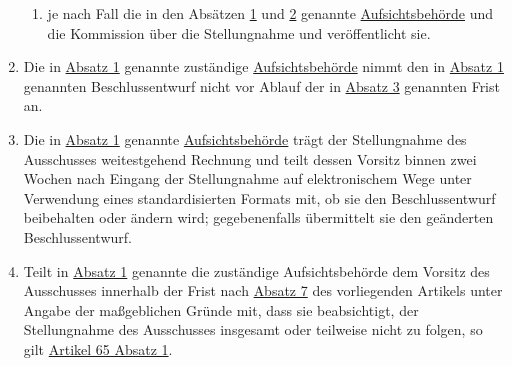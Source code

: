 \begin{enumerate}
\begin{enumerate}
    \item je nach Fall die in den Absätzen \hyperref[itm:64-1]{1} und \hyperref[itm:64-2]{2} genannte \hyperref
     [itm:04-21]{Aufsichtsbehörde} und die Kommission über die Stellungnahme und veröffentlicht sie.%
    \label{itm:64-5b}

  \end{enumerate}

  \item Die in \hyperref[itm:64-1]{Absatz 1} genannte zuständige \hyperref[itm:04-21]{Aufsichtsbehörde} nimmt den in
   \hyperref[itm:64-1]{Absatz 1} genannten Beschlussentwurf nicht vor Ablauf der in \hyperref[itm:64-3]{Absatz 3}
    genannten Frist an.%
  \label{itm:64-6}

  \item Die in \hyperref[itm:64-1]{Absatz 1} genannte \hyperref[itm:04-21]{Aufsichtsbehörde} trägt der Stellungnahme des
   Ausschusses weitestgehend Rechnung und teilt dessen Vorsitz binnen zwei Wochen nach Eingang der Stellungnahme auf
   elektronischem Wege unter Verwendung eines standardisierten Formats mit, ob sie den Beschlussentwurf beibehalten
   oder ändern wird; gegebenenfalls übermittelt sie den geänderten Beschlussentwurf.%
  \label{itm:64-7}

  \item Teilt in \hyperref[itm:64-1]{Absatz 1} genannte die zuständige Aufsichtsbehörde dem Vorsitz des Ausschusses
   innerhalb der Frist nach \hyperref[itm:64-7]{Absatz 7} des vorliegenden Artikels unter Angabe der maßgeblichen
   Gründe mit, dass sie beabsichtigt, der Stellungnahme des Ausschusses insgesamt oder teilweise nicht zu folgen, so
   gilt \hyperref[itm:65-2]{Artikel 65 Absatz 1}.%
  \label{itm:64-8}

\end{enumerate}


